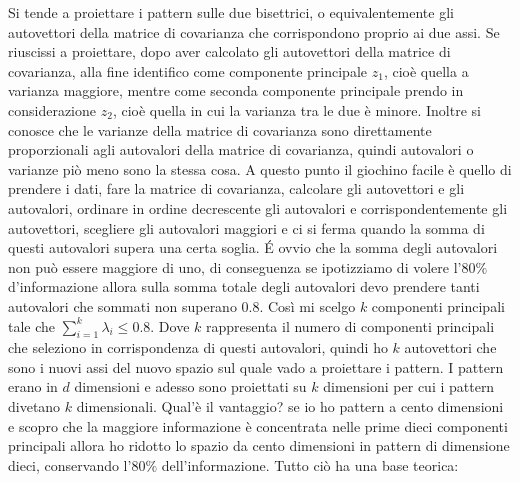 Si tende a proiettare i pattern sulle due bisettrici, o equivalentemente gli autovettori della matrice di covarianza che corrispondono proprio ai due assi. Se riuscissi a proiettare, dopo aver calcolato gli autovettori della matrice di covarianza, alla fine identifico come componente  principale $z_1$, cioè quella a varianza maggiore, mentre come seconda componente principale prendo in considerazione $z_2$, cioè quella in cui la varianza tra le due è minore. Inoltre si conosce che le varianze della matrice di covarianza sono direttamente proporzionali agli autovalori della matrice di covarianza, quindi autovalori o varianze piò meno sono la stessa cosa. A questo punto il giochino facile è quello di prendere i dati, fare la matrice di covarianza, calcolare gli autovettori e gli autovalori, ordinare in ordine decrescente gli autovalori e corrispondentemente gli autovettori, scegliere gli autovalori maggiori e  ci si ferma quando la somma di questi autovalori supera una certa soglia. \'E ovvio che la somma degli autovalori non può essere maggiore di uno, di conseguenza se ipotizziamo di volere l'$80\%$ d'informazione allora sulla somma totale degli autovalori devo prendere tanti autovalori che sommati non superano 0.8. Così mi scelgo $k$ componenti principali tale che $\sum_{i=1}^k \lambda_i \leq 0.8$. Dove $k$ rappresenta il numero di componenti principali che seleziono in corrispondenza di questi autovalori, quindi ho $k$ autovettori che sono i nuovi assi del nuovo spazio sul quale vado a proiettare i pattern. I pattern erano in $d$ dimensioni e adesso sono proiettati su $k$ dimensioni per cui i pattern divetano $k$ dimensionali. Qual'è il vantaggio? se io ho pattern a cento dimensioni e scopro che la maggiore informazione è concentrata nelle prime dieci componenti principali allora ho ridotto lo spazio da cento dimensioni in pattern di dimensione dieci, conservando l'$80\%$ dell'informazione. Tutto ciò ha una base teorica:\\

